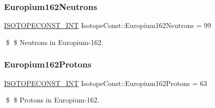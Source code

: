 \subsubsection{\texorpdfstring{Europium162\+Neutrons}{Europium162Neutrons}}
{\footnotesize\ttfamily \mbox{\hyperlink{group___isotope_const-_macros_ga5f18360b3e99483a35c32d789e62621c}{I\+S\+O\+T\+O\+P\+E\+C\+O\+N\+S\+T\+\_\+\+I\+NT}} Isotope\+Const\+::\+Europium162\+Neutrons = 99}

\$ \$ Neutrons in Europium-\/162. \mbox{\label{group___isotope_const-_europium-_eu162_ga18951c5efe7cf8d81da581a1f300601d}} 
\subsubsection{\texorpdfstring{Europium162\+Protons}{Europium162Protons}}
{\footnotesize\ttfamily \mbox{\hyperlink{group___isotope_const-_macros_ga5f18360b3e99483a35c32d789e62621c}{I\+S\+O\+T\+O\+P\+E\+C\+O\+N\+S\+T\+\_\+\+I\+NT}} Isotope\+Const\+::\+Europium162\+Protons = 63}

\$ \$ Protons in Europium-\/162. 